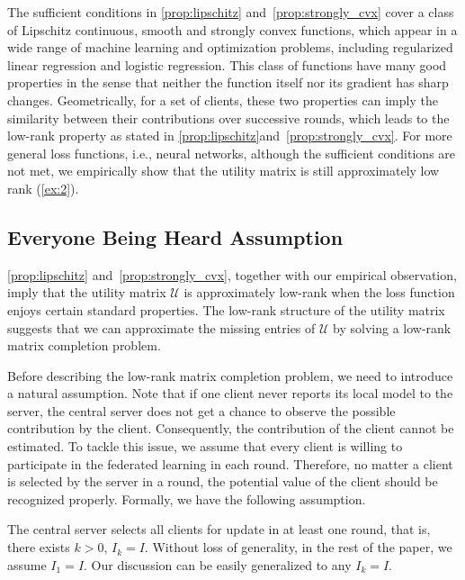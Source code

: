 The sufficient conditions in \autoref{prop:lipschitz} and~\autoref{prop:strongly_cvx} cover a class of Lipschitz continuous, smooth and strongly convex functions, which appear in a wide range of machine learning and optimization problems, including regularized linear regression and logistic regression. This class of functions have many good properties in the sense that neither the function itself nor its gradient has sharp changes. Geometrically, for a set of clients, these two properties can imply the similarity between their contributions over successive rounds, which leads to the low-rank property as stated in \autoref{prop:lipschitz}and~\autoref{prop:strongly_cvx}. For more general loss functions, i.e., neural networks, although the sufficient conditions are not met, we empirically show that the utility matrix is still approximately low rank (\autoref{ex:2}).

\subsection{Everyone Being Heard Assumption}

\autoref{prop:lipschitz} and~\autoref{prop:strongly_cvx}, together with our empirical observation, imply that the utility matrix $\mathcal{U}$ is approximately low-rank when the loss function enjoys certain standard properties. The low-rank structure of the utility matrix suggests that we can approximate the missing entries of $\mathcal{U}$ by solving a low-rank matrix completion problem.

Before describing the low-rank matrix completion problem, we need to introduce a natural assumption. Note that if one client never reports its local model to the server, 
the central server does not get a chance to observe the possible contribution by the client. Consequently, the contribution of the client cannot be estimated. To tackle this issue, we assume that every client is willing to participate in the federated learning in each round.  Therefore, no matter a client is selected by the server in a round, the potential value of the client should be recognized properly.  Formally, we have the following assumption.

\begin{assumption} \label{ass:main}
The central server selects all clients for update in at least one round, that is, there exists $k>0$, $I_k = I$.  Without loss of generality, in the rest of the paper, we assume $I_1=I$. Our discussion can be easily generalized to any $I_k=I$.
\end{assumption}

